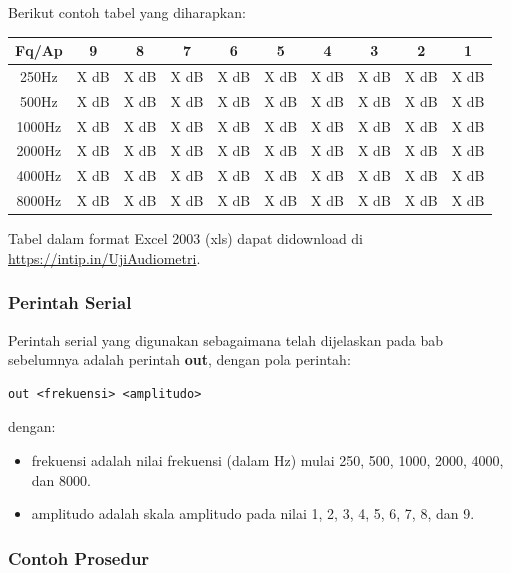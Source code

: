 \documentclass[12pt,]{article}
\begin{document}
	Berikut contoh tabel yang diharapkan:
	
	\begin{center}
		\begin{tabular}{|c|c|c|c|c|c|c|c|c|c|}
			\hline
			Fq/Ap & 9 & 8 & 7 & 6 & 5 & 4 & 3 & 2 & 1\\ [0.5ex]
			\hline\hline
			250Hz & X dB & X dB & X dB & X dB & X dB & X dB & X dB & X dB & X dB\\
			\hline
			500Hz & X dB & X dB & X dB & X dB & X dB & X dB & X dB & X dB & X dB\\
			\hline
			1000Hz & X dB & X dB & X dB & X dB & X dB & X dB & X dB & X dB & X dB\\
			\hline
			2000Hz & X dB & X dB & X dB & X dB & X dB & X dB & X dB & X dB & X dB\\
			\hline
			4000Hz & X dB & X dB & X dB & X dB & X dB & X dB & X dB & X dB & X dB\\
			\hline
			8000Hz & X dB & X dB & X dB & X dB & X dB & X dB & X dB & X dB & X dB\\
			\hline
		\end{tabular}
	\end{center}
	
	Tabel dalam format Excel 2003 (xls) dapat didownload di \url{https://intip.in/UjiAudiometri}.
	
	\subsubsection{Perintah Serial}
	
	Perintah serial yang digunakan sebagaimana telah dijelaskan pada bab sebelumnya adalah perintah \textbf{out},
	dengan pola perintah:
	\begin{verbatim}
out <frekuensi> <amplitudo>
	\end{verbatim}
	dengan:
	\begin{itemize}
		\item frekuensi adalah nilai frekuensi (dalam Hz) mulai 250, 500, 1000, 2000, 4000, dan 8000.
		\item amplitudo adalah skala amplitudo pada nilai 1, 2, 3, 4, 5, 6, 7, 8, dan 9.
	\end{itemize}
	
	\newpage
	\subsubsection{Contoh Prosedur}
	
\end{document}
